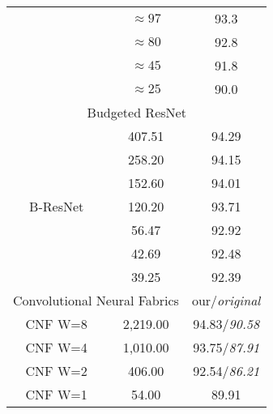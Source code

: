 \begin{table}[h]
\begin{tabular}{|c||cc|}
                              & $\approx 97 $                & 93.3         \\
                              & $\approx 80 $                & 92.8         \\
                              & $\approx 45 $                & 91.8         \\
                              & $\approx 25 $                & 90.0           \\ \hline \hline
\multicolumn{3}{|c|}{Budgeted ResNet}                                       \\ \hline
\multirow{7}{*}{B-ResNet}     & 407.51             & 94.29                       \\
                              & 258.20              & 94.15                       \\
                              & 152.60              & 94.01                       \\
                              & 120.20              & 93.71                       \\
                              & 56.47              & 92.92                       \\
                              & 42.69              & 92.48                       \\
                              & 39.25              & 92.39                       \\ \hline \hline
\multicolumn{2}{|c|}{Convolutional Neural Fabrics \cite{DBLP:journals/corr/SaxenaV16}} & our/\textit{original} \\ \hline
CNF W=8                       & 2,219.00           & 94.83/\textit{90.58}               \\
CNF W=4                       & 1,010.00           & 93.75/\textit{87.91}               \\
CNF W=2                       & 406.00             & 92.54/\textit{86.21}               \\
CNF W=1                       & 54.00              & 89.91                       \\ \hline \hline

\end{tabular}
\end{table}
